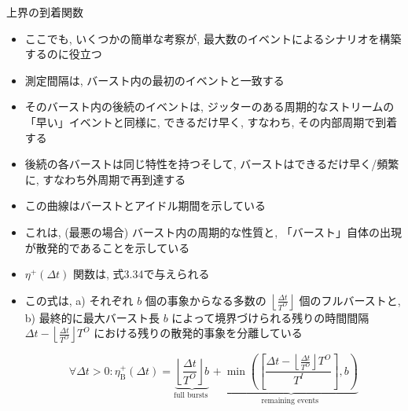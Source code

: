 \begin{frame}{上界の到着関数}
    \begin{itemize}
        \item ここでも, いくつかの簡単な考察が, 最大数のイベントによるシナリオを構築するのに役立つ
        \item 測定間隔は, バースト内の最初のイベントと一致する
        \item そのバースト内の後続のイベントは, ジッターのある周期的なストリームの「早い」イベントと同様に, できるだけ早く, すなわち, その内部周期で到着する
        \item 後続の各バーストは同じ特性を持つそして, バーストはできるだけ早く/頻繁に, すなわち外周期で再到達する
    \end{itemize}
\end{frame}

\begin{frame}{}
\end{frame}

\begin{frame}{}
    \begin{itemize}
        \item この曲線はバーストとアイドル期間を示している
        \item これは,  (最悪の場合) バースト内の周期的な性質と, 「バースト」自体の出現が散発的であることを示している
        \item $\eta^{+}(\Delta t)$ 関数は, 式3.34で与えられる
        \item この式は, a) それぞれ $b$ 個の事象からなる多数の $\left\lfloor\frac{\Delta t}{T^{O}}\right\rfloor$ 個のフルバーストと, b) 最終的に最大バースト長 $b$ によって境界づけられる残りの時間間隔 $\Delta t-\left\lfloor\frac{\Delta t}{T^{O}}\right\rfloor T^{O}$ における残りの散発的事象を分離している

              \begin{equation*}
                  \forall \Delta t>0: \eta_{\mathrm{B}}^{+}(\Delta t)=\underbrace{\left\lfloor\frac{\Delta t}{T^{O}}\right\rfloor b}_{\text {full bursts }}+\underbrace{\min \left(\left[\frac{\Delta t-\left\lfloor\frac{\Delta t}{T^{O}}\right\rfloor T^{O}}{T^{I}}\right], b\right)}_{\text {remaining events }}
              \end{equation*}
    \end{itemize}
\end{frame}

